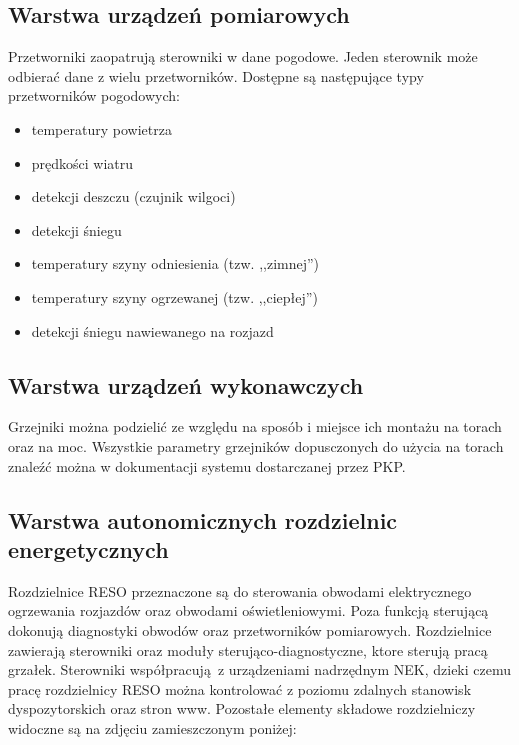 \subsection{Warstwa urządzeń pomiarowych}
Przetworniki zaopatrują sterowniki w dane pogodowe. Jeden sterownik może odbierać dane z wielu przetworników. Dostępne są następujące typy przetworników pogodowych:
\begin{itemize}
\item temperatury powietrza
\item prędkości wiatru
\item detekcji deszczu (czujnik wilgoci)
\item detekcji śniegu
\item temperatury szyny odniesienia (tzw. ,,zimnej'')
\item temperatury szyny ogrzewanej (tzw. ,,ciepłej'')
\item detekcji śniegu nawiewanego na rozjazd
\end{itemize}

\subsection{Warstwa urządzeń wykonawczych}
Grzejniki można podzielić ze względu na sposób i miejsce ich montażu na torach oraz na moc. Wszystkie parametry grzejników dopusczonych do użycia na torach znaleźć można w dokumentacji systemu dostarczanej przez PKP.

\subsection{Warstwa autonomicznych rozdzielnic energetycznych}
Rozdzielnice RESO przeznaczone są do sterowania obwodami elektrycznego ogrzewania rozjazdów oraz obwodami oświetleniowymi. Poza funkcją sterującą dokonują diagnostyki obwodów oraz przetworników pomiarowych. Rozdzielnice zawierają sterowniki oraz moduły sterująco-diagnostyczne, ktore sterują pracą grzałek. Sterowniki współpracują z urządzeniami nadrzędnym NEK, dzieki czemu pracę rozdzielnicy RESO można kontrolować z poziomu zdalnych stanowisk dyspozytorskich oraz stron www. Pozostałe elementy składowe rozdzielniczy widoczne są na zdjęciu zamieszczonym poniżej:

